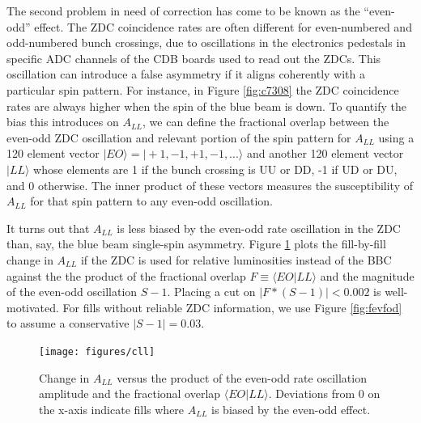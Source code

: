 
The second problem in need of correction has come to be known as the
``even-odd'' effect.  The ZDC coincidence rates are often
different for even-numbered and odd-numbered bunch crossings, due to
oscillations in the electronics pedestals in specific ADC channels of the CDB
boards used to read out the ZDCs. This oscillation can introduce a false
asymmetry if it aligns coherently with a particular spin pattern. For instance,
in Figure \ref{fig:c7308} the ZDC coincidence rates are always higher when the
spin of the blue beam is down.  To quantify the bias this introduces on $A_{LL}$, we can
define the fractional overlap between the even-odd ZDC oscillation and relevant
portion of the spin pattern for $A_{LL}$ using a 120 element vector $|EO\rangle
= |+1,-1,+1,-1,...\rangle$ and another 120 element vector $|LL\rangle$ whose
elements are 1 if the bunch crossing is UU or DD, -1 if UD or DU, and 0
otherwise. The inner product of these vectors measures the susceptibility of
$A_{LL}$ for that spin pattern to any even-odd oscillation.


It turns out that $A_{LL}$ is less biased by the even-odd rate oscillation in
the ZDC than, say, the blue beam single-spin asymmetry. Figure \ref{fig:cll}
plots the fill-by-fill change in $A_{LL}$ if the ZDC is used for relative
luminosities instead of the BBC against the the product of the fractional
overlap $F \equiv \langle EO | LL \rangle$ and the magnitude of the even-odd
oscillation $S-1$. Placing a cut on $|F*(S-1)| < 0.002$ is well-motivated. For
fills without reliable ZDC information, we use Figure \ref{fig:fevfod} to
assume a conservative $|S-1| = 0.03$.

\begin{figure}
  \begin{center}
  \texttt{[image: figures/cll]}
  \end{center}
  \caption{Change in $A_{LL}$ versus the product of the even-odd rate oscillation amplitude and the fractional overlap $\langle EO | LL \rangle$.  Deviations from 0 on the x-axis indicate fills where $A_{LL}$ is biased by the even-odd effect.}
  \label{fig:cll}
\end{figure}

